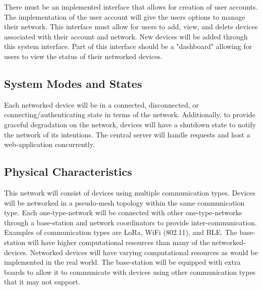 \documentclass[tikz,a4paper,titlepage]{article}
\begin{document}
There must be an implemented interface that allows for creation of user accounts. The implementation of the user account will give the users options to manage their network. This interface must allow for users to add, view, and delete devices associated with their account and network. New devices will be added through this system interface. Part of this interface should be a "dashboard" allowing for users to view the status of their networked devices.



\subsection{System Modes and States} %

Each networked device will be in a connected, disconnected, or connecting/authenticating state in terms of the network. Additionally, to provide graceful degradation on the network, devices will have a shutdown state to notify the network of its intentions. The central server will handle requests and host a web-application concurrently.

\subsection{Physical Characteristics} %


This network will consist of devices using multiple communication types. Devices will be networked in a pseudo-mesh topology within the same communication type. Each one-type-network will be connected with other one-type-networks through a base-station and network coordinators to provide inter-communication. Examples of communication types are LoRa, WiFi (802.11), and BLE. The base-station will have higher computational resources than many of the networked-devices. Networked devices will have varying computational resources as would be implemented in the real world. The base-station will be equipped with extra boards to allow it to communicate with devices using other communication types that it may not support.
\end{document}
